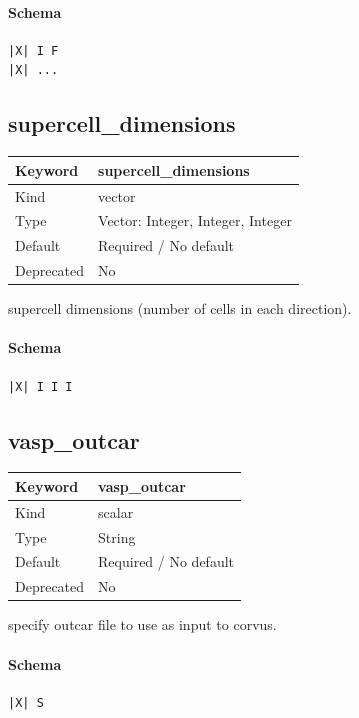 \documentclass[11pt]{article}
\begin{document}
\paragraph{Schema}
\begin{Verbatim}
|X| I F
|X| ...
\end{Verbatim}

\subsection{supercell\_dimensions}
\label{kw:supercell-dimensions}
\begin{longtable}{|p{1.5in}|p{4.5in}|}
\hline
Keyword & supercell\_dimensions \\
\hline
Kind & vector \\
\hline
Type & Vector: Integer, Integer, Integer \\
\hline
Default & Required / No default \\
\hline
Deprecated & No \\
\hline
\end{longtable}
 supercell dimensions (number of cells in each direction).

\paragraph{Schema}
\begin{Verbatim}
|X| I I I
\end{Verbatim}

\subsection{vasp\_outcar}
\label{kw:vasp-outcar}
\begin{longtable}{|p{1.5in}|p{4.5in}|}
\hline
Keyword & vasp\_outcar \\
\hline
Kind & scalar \\
\hline
Type & String \\
\hline
Default & Required / No default \\
\hline
Deprecated & No \\
\hline
\end{longtable}
 specify outcar file to use as input to corvus.

\paragraph{Schema}
\begin{Verbatim}
|X| S
\end{Verbatim}
\end{document}
